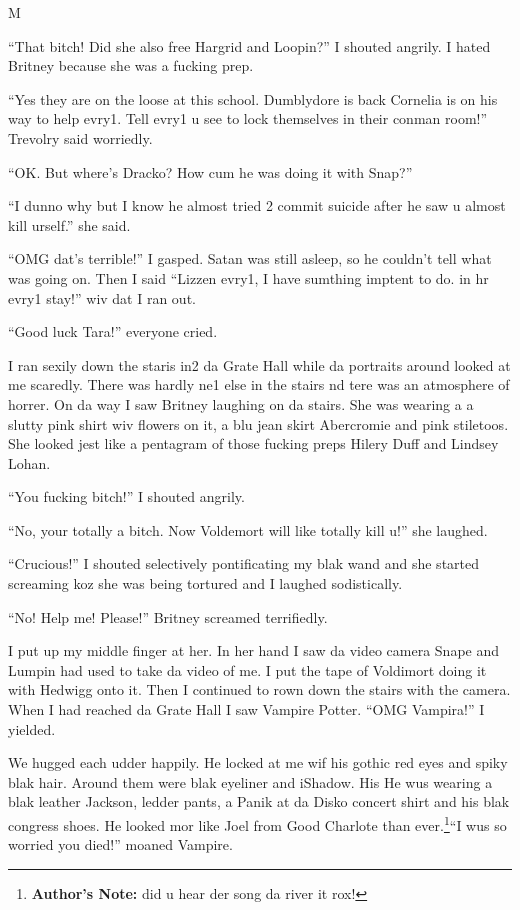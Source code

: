 M\documentclass{article}
\begin{document}
“That bitch! Did she also free Hargrid and Loopin?” I shouted angrily. I hated Britney because she was a fucking prep.

“Yes they are on the loose at this school. Dumblydore is back Cornelia is on his way to help evry1. Tell evry1 u see to lock themselves in their conman room!” Trevolry said worriedly.

“OK. But where’s Dracko? How cum he was doing it with Snap?”

“I dunno why but I know he almost tried 2 commit suicide after he saw u almost kill urself.” she said.

“OMG dat’s terrible!” I gasped. Satan was still asleep, so he couldn’t tell what was going on. Then I said “Lizzen evry1, I have sumthing imptent to do. in hr evry1 stay!” wiv dat I ran out.

“Good luck Tara!” everyone cried.

I ran sexily down the staris in2 da Grate Hall while da portraits around looked at me scaredly. There was hardly ne1 else in the stairs nd tere was an atmosphere of horrer. On da way I saw Britney laughing on da stairs. She was wearing a a slutty pink shirt wiv flowers on it, a blu jean skirt Abercromie and pink stiletoos. She looked jest like a pentagram of those fucking preps Hilery Duff and Lindsey Lohan.

“You fucking bitch!” I shouted angrily.

“No, your totally a bitch. Now Voldemort will like totally kill u!” she laughed.

“Crucious!” I shouted selectively pontificating my blak wand and she started screaming koz she was being tortured and I laughed sodistically.

“No! Help me! Please!” Britney screamed terrifiedly.

I put up my middle finger at her. In her hand I saw da video camera Snape and Lumpin had used to take da video of me. I put the tape of Voldimort doing it with Hedwigg onto it. Then I continued to rown down the stairs with the camera. When I had reached da Grate Hall I saw Vampire Potter. “OMG Vampira!” I yielded.

We hugged each udder happily. He locked at me wif his gothic red eyes and spiky blak hair. Around them were blak eyeliner and iShadow. His He wus wearing a blak leather Jackson, ledder pants, a Panik at da Disko concert shirt and his blak congress shoes. He looked mor like Joel from Good Charlote than ever.\footnote{\textbf{Author's Note: }did u hear der song da river it rox!}“I wus so worried you died!” moaned Vampire.
\end{document}
